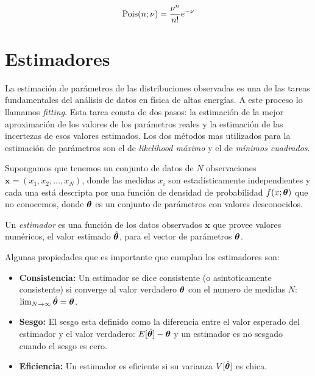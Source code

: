 \begin{equation}
  \Pois(n;\nu) = \frac{\nu^n}{n!} e^{-\nu} %
\end{equation}




\section{Estimadores}

La estimación de parámetros de las distribuciones observadas es una de las
tareas fundamentales del análisis de datos en física de altas energías. A este
proceso lo llamamos \emph{fitting}. Esta tarea consta de dos pasos: la
estimación de la mejor aproximación de los valores de los parámetros reales y la
estimación de las incertezas de esos valores estimados. Los dos métodos mas
utilizados para la estimación de parámetros son el de \emph{likelihood máximo} y
el de \emph{mínimos cuadrados}.

Supongamos que tenemos un conjunto de datos de $N$ observaciones $\bm{x} = (x_1,
x_2, \ldots, x_N)$, donde las medidas $x_i$ son estadísticamente independientes
y cada una está descripta por una función de densidad de probabilidad
$f(x;\bm{\theta})$ que no conocemos, donde $\bm{\theta}$ es un conjunto de parámetros
con valores desconocidos.

Un \emph{estimador} es una función de los datos observados $\bm{x}$ que provee
valores numéricos, el valor estimado $\hat{\bm{\theta}}$, para el vector de
parámetros $\bm{\theta}$.

Algunas propiedades que es importante que cumplan los estimadores son:

\begin{itemize}\itemsep0.2cm\parskip0.2cm
\item[] {\bf Consistencia:} Un estimador se dice consistente (o asintoticamente
  consistente) si converge al valor verdadero $\bm{\theta}$ con el numero de medidas
  $N$: $\lim_{N \rightarrow \infty} \hat{\bm{\theta}} = \bm{\theta}$.

\item[] {\bf Sesgo:} El sesgo esta definido como la diferencia entre el valor
  esperado del estimador y el valor verdadero: $E[\hat{\bm{\theta}}] - \bm{\theta}$ y un
  estimador es no sesgado cuando el sesgo es cero.

\item[] {\bf Eficiencia:} Un estimador es eficiente si su varianza
  $V[\hat{\bm{\theta}}]$ es chica.
\end{itemize}


